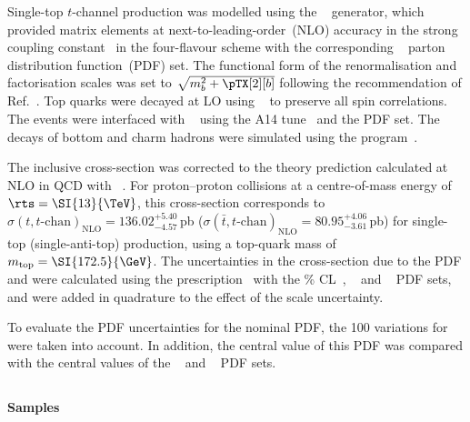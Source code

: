 Single-top $t$-channel production was modelled using the
\POWHEGBOX[v2]~\cite{Frederix:2012dh,Nason:2004rx,Frixione:2007vw,Alioli:2010xd}
generator, which provided matrix elements at next-to-leading-order~(NLO) 
accuracy in the strong coupling constant \alphas\ in the four-flavour 
scheme with the corresponding \NNPDF[3.0nlo]~\cite{Ball:2014uwa} parton
distribution function~(PDF) set.  The functional form of the
renormalisation and factorisation scales was set to
$\sqrt{m_b^2 + \pTX[2][b]}$ following the
recommendation of Ref.~\cite{Frederix:2012dh}. Top quarks were decayed at
LO using \MADSPIN~\cite{Frixione:2007zp,Artoisenet:2012st} to preserve
all spin correlations.  The events were interfaced with
\PYTHIA[8.230]~\cite{Sjostrand:2014zea} using the A14
tune~\cite{ATL-PHYS-PUB-2014-021} and the \NNPDF[2.3lo] PDF set.  
The decays of bottom and charm hadrons were simulated using the
\EVTGEN[1.6.0] program~\cite{Lange:2001uf}.

The inclusive cross-section was corrected to the theory prediction calculated at NLO in QCD with 
\HATHOR[2.1]~\cite{Aliev:2010zk,Kant:2014oha}.
For proton--proton collisions at a centre-of-mass energy of $\rts = \SI{13}{\TeV}$, this cross-section corresponds to
$\sigma(t,t\text{-chan})_\text{NLO}= 136.02^{+5.40}_{-4.57}$\,pb ($\sigma(\bar{t},t\text{-chan})_\text{NLO}=80.95^{+4.06}_{-3.61}$\,pb)
for single-top (single-anti-top) production, using a top-quark mass of $\mtop = \SI{172.5}{\GeV}$.
The uncertainties in the cross-section due to the PDF and \alphas were calculated using the \PDFforLHC prescription~\cite{Butterworth:2015oua}
with the \% CL~\cite{Martin:2009iq,Martin:2009bu}, \CT[10nlo]~\cite{Lai:2010vv} 
and \NNPDF[2.3nlo]~\cite{Ball:2012cx} PDF sets,
and were added in quadrature to the effect of the scale uncertainty.



To evaluate the PDF uncertainties for the nominal PDF, the 100 variations for \NNPDF[3.0nlo] were taken into account. 
In addition, the central value of this PDF was compared with the central values of the \CT[14nnlo]~\cite{Dulat:2015mca} 
and \MMHT[nnlo]~\cite{Harland-Lang:2014zoa} PDF sets.


\subsection[Powheg+Herwig7]{\POWHER[7]}
\label{subsubsec:tchan_PH7}

\paragraph{Samples}

